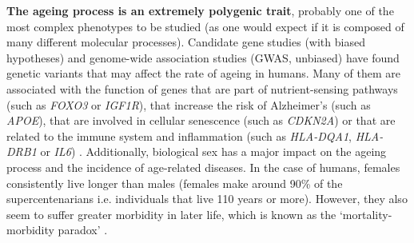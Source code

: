 \textbf{The ageing process is an extremely polygenic trait}, probably one of the most complex phenotypes to be studied (as one would expect if it is composed of many different molecular processes). Candidate gene studies (with biased hypotheses) and genome-wide association studies (\acrshort{GWAS}, unbiased) have found genetic variants that may affect the rate of ageing in humans. Many of them are associated with the function of genes that are part of nutrient-sensing pathways (such as \textit{FOXO3} or \textit{IGF1R}), that increase the risk of Alzheimer's (such as \textit{APOE}), that are involved in cellular senescence (such as \textit{CDKN2A}) or that are related to the immune system and inflammation (such as \textit{HLA-DQA1}, \textit{HLA-DRB1} or \textit{IL6}) \citep{Singh2019,Partridge2018}. Additionally, biological sex has a major impact on the ageing process and the incidence of age-related diseases. In the case of humans, females consistently live longer than males (females make around 90\% of the supercentenarians i.e. individuals that live 110 years or more). However, they also seem to suffer greater morbidity in later life, which is known as the `mortality-morbidity paradox' \citep{Austad2016}.

\bigskip


